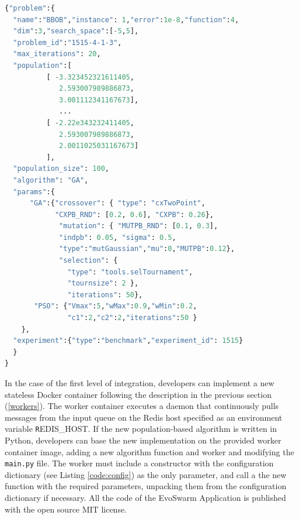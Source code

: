 \documentclass[review]{elsarticle}
\begin{document}
\begin{lstlisting}[language=Python, caption = Configuration message example, label=code:config]
{"problem":{
  "name":"BBOB","instance": 1,"error":1e-8,"function":4,
  "dim":3,"search_space":[-5,5],
  "problem_id":"1515-4-1-3",
  "max_iterations": 20,
  "population":[
          [ -3.323452321611405, 
             2.593007989886873, 
             3.001112341167673],
             ...
          [ -2.22e343232411405, 
             2.593007989886873, 
             2.0011025031167673] 
          ],
  "population_size": 100,
  "algorithm": "GA",  
  "params":{
      "GA":{"crossover": { "type": "cxTwoPoint", 
            "CXPB_RND": [0.2, 0.6], "CXPB": 0.26},
             "mutation": { "MUTPB_RND": [0.1, 0.3], 
             "indpb": 0.05, "sigma": 0.5, 
             "type":"mutGaussian","mu":0,"MUTPB":0.12},
             "selection": { 
               "type": "tools.selTournament", 
               "tournsize": 2 },
               "iterations": 50},
       "PSO": {"Vmax":5,"wMax":0.9,"wMin":0.2,
               "c1":2,"c2":2,"iterations":50 } 
    },
  "experiment":{"type":"benchmark","experiment_id": 1515}
  }
}
\end{lstlisting}

In the case of the first level of integration, developers
can implement a new stateless Docker container following
the description in the previous section (\ref{workers}). The worker
container executes a daemon that continuously pulls messages from the input queue
on the Redis host specified as an environment variable {\texttt REDIS\_HOST}. If the new
population-based algorithm is written in Python, developers can base the new
implementation on the provided worker container image, adding a new algorithm
function and worker and modifying the \texttt{main.py} file. 
The worker must include a constructor with the configuration dictionary 
(see Listing \ref{code:config}) as the only parameter, and call a the new function 
with the required parameters, unpacking them from the configuration dictionary if necessary.
All the code of the EvoSwarm Application is published with the open source MIT license.
\end{document}
